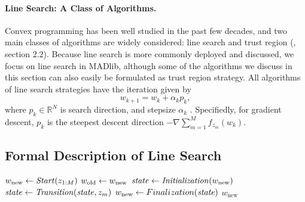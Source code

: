 \paragraph{Line Search: A Class of Algorithms.}
Convex programming has been well studied in the past few decades, and two main classes of algorithms are widely considered: line search and trust region (\cite{nocedal2006numerical}, section 2.2).
Because line search is more commonly deployed and discussed, we focus on line search in MADlib, although some of the algorithms we discuss in this section can also easily be formulated as trust region strategy.
All algorithms of line search strategies have the iteration given by
\[w_{k+1} = w_k + \alpha_k p_k,\]
where $p_k \in \mathbb{R}^N$ is search direction, and stepsize $\alpha_k$ \cite{nocedal2006numerical}.
Specifiedly, for gradient descent, $p_k$ is the steepest descent direction $- \nabla \sum_{m=1}^M f_{z_m}(w_k)$.

\subsection{Formal Description of Line Search}
\begin{algorithm} \label{alg:line-search}
\begin{algorithmic}[1]
	\State $w_\text{new} \leftarrow \mathit{Start}(z_{1:M})$
	\Repeat
        \State $w_\text{old} \leftarrow w_\text{new}$
        \State $\mathit{state} \leftarrow \mathit{Initialization}(w_\text{new})$
		 
			\State $\mathit{state} \leftarrow \mathit{Transition}(\mathit{state}, z_m)$
		\EndFor
		\State $w_\text{new} \leftarrow Finalization(\mathit{state})$
    \State \Return $w_\text{new}$
\end{algorithmic}
\end{algorithm}


